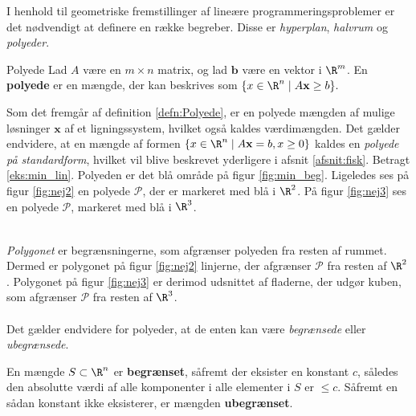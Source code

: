 I henhold til geometriske fremstillinger af lineære programmeringsproblemer er det nødvendigt at definere en række begreber.
Disse er \textit{hyperplan}, \textit{halvrum} og \textit{polyeder}.
%
\begin{defn}{}{Polyede}
Lad $A$ være en $m \times n$ matrix, og lad $\mathbf{b}$ være en vektor i  $\R^m$.
En \textbf{polyede} er en mængde, der kan beskrives som 
$\{x\in \R^n \mid A\mathbf{x}\geq b\}.$
%
\end{defn}
\noindent
%
Som det fremgår af definition \ref{defn:Polyede}, er en polyede mængden af mulige løsninger $\mathbf{x}$ af et ligningssystem, hvilket også kaldes værdimængden.
Det gælder endvidere, at en mængde af formen $ \{x \in \R^n \mid A\textbf{x}=b,x \geq 0 \}$ kaldes en \textit{polyede på standardform}, hvilket vil blive beskrevet yderligere i afsnit \ref{afsnit:fisk}.
%
Betragt \ref{eks:min_lin}. Polyeden er det blå område på figur \ref{fig:min_beg}. 
Ligeledes ses på figur \ref{fig:nej2} en polyede $\mathcal{P}$, der er markeret med blå i $\R^2$. 
På figur \ref{fig:nej3} ses en polyede $\mathcal{P}$, markeret med blå i $\R^3$. 
%
%
\begin{center}
$
\begin{array}{cc}
&

\end{array}
$
\end{center}
%
\textit{Polygonet} er begrænsningerne, som afgrænser polyeden fra resten af rummet. 
Dermed er polygonet på figur \ref{fig:nej2} linjerne, der afgrænser $\mathcal{P}$ fra resten af $\R^2$.
Polygonet på figur \ref{fig:nej3} er derimod udsnittet af fladerne, der udgør kuben, som afgrænser $\mathcal{P}$ fra resten af $\R^3$.
\\\\
%
Det gælder endvidere for polyeder, at de enten kan være \textit{begrænsede} eller \textit{ubegrænsede}.
%
\begin{defn}{}{}
En mængde $S \subset \R^n$ er \textbf{begrænset}, såfremt der eksister en konstant $c$, således den absolutte værdi af alle komponenter i alle elementer i $S$ er $\leq c$. 
Såfremt en sådan konstant ikke eksisterer, er mængden \textbf{ubegrænset}. 
\end{defn}
